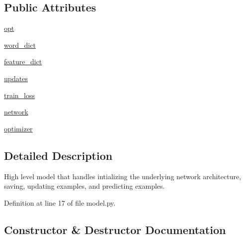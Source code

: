 \subsection*{Public Attributes}
\begin{DoxyCompactItemize}
\item 
\hyperlink{classparlai_1_1agents_1_1drqa_1_1model_1_1DocReaderModel_ae6b1a15378e076ef66f15bf4183f8d69}{opt}
\item 
\hyperlink{classparlai_1_1agents_1_1drqa_1_1model_1_1DocReaderModel_a2c53c78892ade8ebd82cb581608d58dd}{word\+\_\+dict}
\item 
\hyperlink{classparlai_1_1agents_1_1drqa_1_1model_1_1DocReaderModel_a89edfda425c66170c166156d5f3e8a18}{feature\+\_\+dict}
\item 
\hyperlink{classparlai_1_1agents_1_1drqa_1_1model_1_1DocReaderModel_aa614f2c9cef3332b2af7a48552820f17}{updates}
\item 
\hyperlink{classparlai_1_1agents_1_1drqa_1_1model_1_1DocReaderModel_aaea517209501c80d5d8b86fa666c8dc6}{train\+\_\+loss}
\item 
\hyperlink{classparlai_1_1agents_1_1drqa_1_1model_1_1DocReaderModel_a2c06172550232ff17fa3b6538c1b3d55}{network}
\item 
\hyperlink{classparlai_1_1agents_1_1drqa_1_1model_1_1DocReaderModel_a97fe699cd31edef437716191498eedd9}{optimizer}
\end{DoxyCompactItemize}


\subsection{Detailed Description}
\begin{DoxyVerb}High level model that handles intializing the underlying network
architecture, saving, updating examples, and predicting examples.
\end{DoxyVerb}
 

Definition at line 17 of file model.\+py.



\subsection{Constructor \& Destructor Documentation}
\mbox{\label{classparlai_1_1agents_1_1drqa_1_1model_1_1DocReaderModel_ab669b8ef6f50f9c6d81f3544c42727e9}} 
